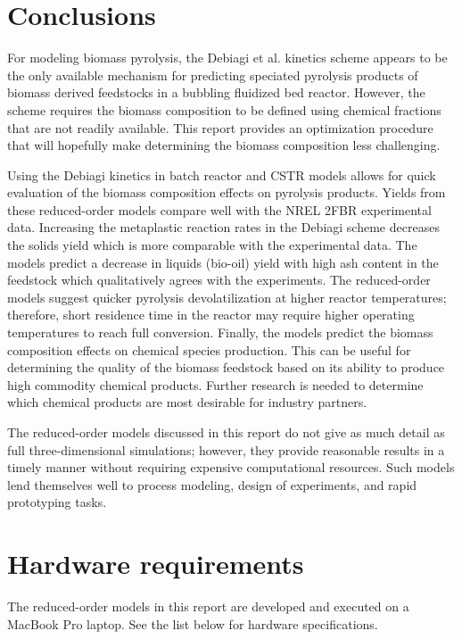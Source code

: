 
\section{Conclusions}

For modeling biomass pyrolysis, the Debiagi et al. kinetics scheme appears to be the only available mechanism for predicting speciated pyrolysis products of biomass derived feedstocks in a bubbling fluidized bed reactor. However, the scheme requires the biomass composition to be defined using chemical fractions that are not readily available. This report provides an optimization procedure that will hopefully make determining the biomass composition less challenging.

Using the Debiagi kinetics in batch reactor and CSTR models allows for quick evaluation of the biomass composition effects on pyrolysis products. Yields from these reduced-order models compare well with the NREL 2FBR experimental data. Increasing the metaplastic reaction rates in the Debiagi scheme decreases the solids yield which is more comparable with the experimental data. The models predict a decrease in liquids (bio-oil) yield with high ash content in the feedstock which qualitatively agrees with the experiments. The reduced-order models suggest quicker pyrolysis devolatilization at higher reactor temperatures; therefore, short residence time in the reactor may require higher operating temperatures to reach full conversion. Finally, the models predict the biomass composition effects on chemical species production. This can be useful for determining the quality of the biomass feedstock based on its ability to produce high commodity chemical products. Further research is needed to determine which chemical products are most desirable for industry partners.

The reduced-order models discussed in this report do not give as much detail as full three-dimensional simulations; however, they provide reasonable results in a timely manner without requiring expensive computational resources. Such models lend themselves well to process modeling, design of experiments, and rapid prototyping tasks.

\section{Hardware requirements}

The reduced-order models in this report are developed and executed on a MacBook Pro laptop. See the list below for hardware specifications.

